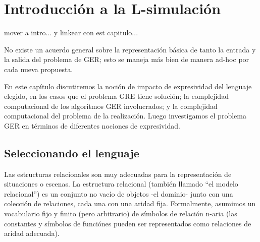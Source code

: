 \chapter{Introducci\'on a la L-simulaci\'on}
\label{sec:intro_logica}

mover a intro... y linkear con est capitulo...

No existe un acuerdo general sobre la representaci\'on b\'asica de
tanto la entrada y la salida del problema de GER; esto se maneja m\'as bien de manera ad-hoc
por cada nueva propuesta.

%
%
%
%

En este cap\'itulo discutiremos la noci\'on de impacto de expresividad del lenguaje elegido, 
en los casos que el problema GRE tiene soluci\'on; la complejidad computacional de los algoritmos GER involucrados; 
y la complejidad computacional del problema de la realizaci\'on. Luego investigamos el problema GER en t\'erminos de diferentes 
nociones de expresividad. 


\section{Seleccionando el lenguaje}


Las estructuras relacionales son muy adecuadas para la representaci\'on de situaciones o escenas. La estructura relacional (tambi\'en llamado ``el modelo relacional'') es un conjunto no vac\'io de objetos -el dominio- junto con una colecci\'on de relaciones, cada una con una aridad fija.
Formalmente, asumimos un vocabulario fijo y finito (pero arbitrario) de
s\'imbolos de relaci\'on n-aria (las constantes y s\'imbolos de funci\'ones pueden ser representados como relaciones de aridad adecuada). 



